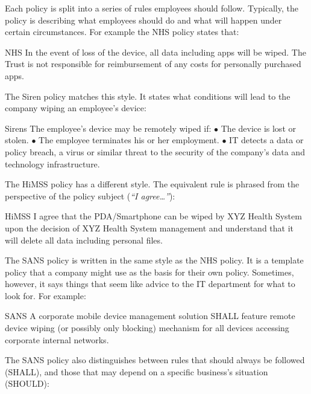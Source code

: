 \documentclass[thesis.tex]{subfiles}
\begin{document}
\noindent Each policy is split into a series of rules employees
should follow. Typically, the policy is describing what employees should
do and what will happen under certain circumstances. For example the NHS policy
states that:

\begin{policyrule}{NHS}
  In the event of loss of the device, all data including apps will be wiped. The Trust
  is not responsible for reimbursement of any costs for personally purchased apps.
\end{policyrule}

The Siren policy matches this style. It states what conditions will lead to the
company wiping an employee's device:

\begin{policyrule}{Sirens}
The employee's device may be remotely wiped if: $\bullet$ The device is lost or
stolen. $\bullet$ The employee terminates his or her employment. $\bullet$ IT
detects a data or policy breach, a virus or similar threat to the security of
the company's data and technology infrastructure.
\end{policyrule}

The \ac{HiMSS} policy has a different style.
The equivalent rule is phrased from the perspective of the policy subject
(\emph{``I agree\dots''}):

\begin{policyrule}{HiMSS}
  I agree that the PDA/Smartphone can be wiped by XYZ Health System upon the
  decision of XYZ Health System management and understand that it will delete all
  data including personal files.
\end{policyrule}

The SANS policy is written in the same style as the NHS policy.  It is
a template policy that a company might use as the basis for their
own policy. Sometimes, however, it says things that seem like advice to the IT
department for what to look for.  For example:

\begin{policyrule}{SANS}
   A corporate mobile device management solution SHALL feature remote device
   wiping (or possibly only blocking) mechanism for all devices accessing
   corporate internal networks.
\end{policyrule}

The SANS policy also distinguishes between rules that should always be followed (SHALL),
and those that may depend on a specific business's situation (SHOULD):
\end{document}
